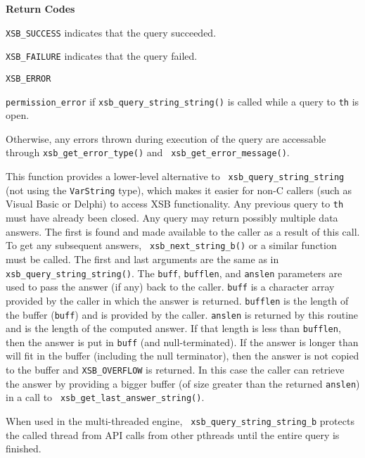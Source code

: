 \begin{description}
{\bf Return Codes}  
\bi
\item {\tt XSB\_SUCCESS} indicates that the query succeeded.
%
\item {\tt XSB\_FAILURE} indicates that the query failed.
%
\item {\tt XSB\_ERROR} 
\bi
\item {\tt permission\_error} if {\tt xsb\_query\_string\_string()} is
  called while a query to {\tt th} is open.
%
\item Otherwise, any errors thrown during execution of the query are
  accessable through {\tt xsb\_get\_error\_type()} and {\tt
    xsb\_get\_error\_message()}.  
\ei 
\ei

\item[{\mbox{\tt {\small int xsb\_query\_string\_string\_b(th\_context *th,char *query,char *buff,int bufflen,int *anslen,char *sep)}}}]
%
This function provides a lower-level alternative to {\tt
  xsb\_query\_string\_string} (not using the {\tt VarString} type),
which makes it easier for non-C callers (such as Visual Basic or
Delphi) to access XSB functionality.  Any previous query to {\tt th}
must have already been closed.  Any query may return possibly multiple
data answers.  The first is found and made available to the caller as
a result of this call.  To get any subsequent answers, {\tt
  xsb\_next\_string\_b()} or a similar function must be called.  The
first and last arguments are the same as in {\tt
  xsb\_query\_string\_string()}.  The \verb|buff|, \verb|bufflen|, and
\verb|anslen| parameters are used to pass the answer (if any) back to
the caller.  \verb|buff| is a character array provided by the caller
in which the answer is returned.  \verb|bufflen| is the length of the
buffer (\verb|buff|) and is provided by the caller.  \verb|anslen| is
returned by this routine and is the length of the computed answer.  If
that length is less than \verb|bufflen|, then the answer is put in
\verb|buff| (and null-terminated).  If the answer is longer than will
fit in the buffer (including the null terminator), then the answer is
not copied to the buffer and {\tt XSB\_OVERFLOW} is returned.  In this
case the caller can retrieve the answer by providing a bigger buffer
(of size greater than the returned \verb|anslen|) in a call to {\tt
  xsb\_get\_last\_answer\_string()}.

When used in the multi-threaded engine, {\tt
  xsb\_query\_string\_string\_b} protects the called thread from API
calls from other pthreads until the entire query is finished.


\end{description}
